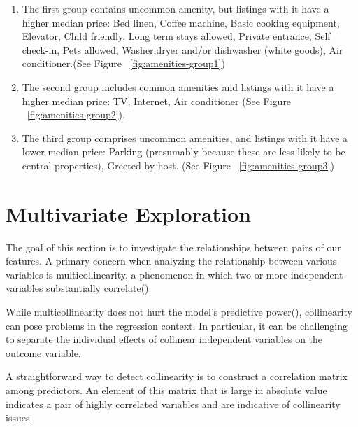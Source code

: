 \begin{enumerate}

  \item The first group contains uncommon amenity, but listings with it have a
    higher median price: Bed linen, Coffee machine, Basic cooking equipment,
    Elevator, Child friendly, Long term stays allowed, Private entrance, Self
    check-in, Pets allowed, Washer,dryer and/or dishwasher (white goods), Air
    conditioner.(See Figure ~\ref{fig:amenities-group1})

  \item The second group includes common amenities and listings with it have a
higher median price: TV, Internet, Air conditioner (See Figure ~\ref{fig:amenities-group2}).

  \item The third group comprises uncommon amenities, and listings with it have
    a lower median price: Parking (presumably because these are less likely to
    be central properties), Greeted by host. (See Figure ~\ref{fig:amenities-group3})

\end{enumerate}

\section{Multivariate Exploration}
\label{sec:multivariate-exploration}

The goal of this section is to investigate the relationships between pairs of
our features. A primary concern when analyzing the relationship between various
variables is multicollinearity, a phenomenon in which two or more independent
variables substantially correlate(\textcite{cohen2013applied}).

While multicollinearity does not hurt the model's predictive
power(\textcite{kutner2005applied}), collinearity can pose problems in the
regression context. In particular,  it can be challenging to separate the
individual effects of collinear independent variables on the outcome variable.

A straightforward way to detect collinearity is to construct a correlation
matrix among predictors.  An element of this matrix that is large in absolute
value indicates a pair of highly correlated variables and are indicative of
collinearity issues.

